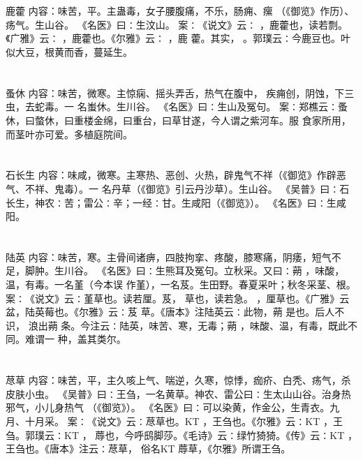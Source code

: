 \documentclass[12pt,UTF8]{ctexbook}
\begin{document}
\section{}鹿藿
内容：味苦，平。主蛊毒，女子腰腹痛，不乐，肠痈、瘰 （《御览》作历）、疡气。生山谷。 
《名医》曰∶生汶山。 
案∶《说文》云∶ ，鹿藿也，读若剽。《广雅》云∶ ，鹿藿也。《尔雅》云∶ ，鹿 
藿。其实， 。郭璞云∶今鹿豆也。叶似大豆，根黄而香，蔓延生。 


\section{}蚤休
内容：味苦，微寒。主惊痫、摇头弄舌，热气在腹中， 疾痈创，阴蚀，下三虫，去蛇毒。一 
名蚩休。生川谷。 
《名医》曰∶生山及冤句。 
案∶郑樵云∶蚤休，曰螫休，曰重楼金绵，曰重台，曰草甘遂，今人谓之紫河车。服 
食家所用，而茎叶亦可爱。多植庭院间。 


\section{}石长生
内容：味咸，微寒。主寒热、恶创、火热，辟鬼气不祥（《御览》作辟恶气、不祥、鬼毒）。一 
名丹草（《御览》引云丹沙草）。生山谷。 
《吴普》曰∶石长生，神农∶苦；雷公∶辛；一经∶甘。生咸阳（《御览》）。 
《名医》曰∶生咸阳。 


\section{}陆英
内容：味苦，寒。主骨间诸痹，四肢拘挛、疼酸，膝寒痛，阴痿，短气不足，脚肿。生川谷。 
《名医》曰∶生熊耳及冤句。立秋采。又曰∶蒴 ，味酸，温，有毒。一名堇（今本误 
作堇），一名芨。生田野。春夏采叶；秋冬采茎、根。 
案∶《说文》云∶堇草也。读若厘。芨， 草也，读若急。 ，厘草也。《广雅》云 
盆，陆英莓也。《尔雅》云∶芨 草。《唐本》注陆英云∶此物，蒴 是也。后人不识， 
浪出蒴 条。今注云∶陆英，味苦、寒，无毒；蒴 ，味酸、温，有毒，既此不同。难谓一 
种，盖其类尔。 


\section{}荩草
内容：味苦，平，主久咳上气、喘逆，久寒，惊悸，痂疥、白秃、疡气，杀皮肤小虫。 
《吴普》曰∶王刍，一名黄草。神农、雷公曰∶生太山山谷。治身热邪气，小儿身热气 
（《御览》）。 
《名医》曰∶可以染黄，作金公，生青衣。九月、十月采。 
案∶《说文》云∶荩草也。KT ，王刍也。《尔雅》云∶KT ，王刍。郭璞云∶KT ， 
蓐也，今呼鸱脚莎。《毛诗》云∶绿竹猗猗。《传》云∶KT ，王刍也。《唐本》注云∶荩草， 
俗名KT 蓐草，《尔雅》所谓王刍。 
\end{document}

